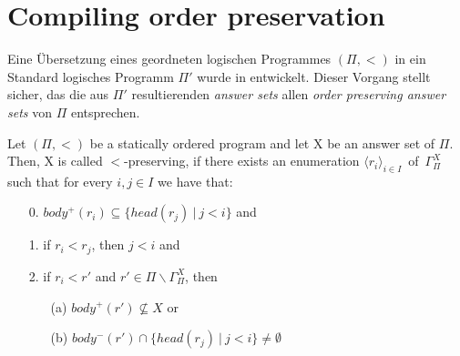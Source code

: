 \section{Compiling order preservation}

Eine Übersetzung eines geordneten logischen Programmes $(\Pi, <)$ in ein
Standard logisches Programm $\Pi'$ wurde in \cite{delgrande2000logic} entwickelt.
Dieser Vorgang stellt sicher, das die aus $\Pi'$ resultierenden \emph{answer sets}
allen \emph{order preserving answer sets} von $\Pi$ entsprechen.

\begin{definition}
  Let $(\Pi, <)$ be a statically ordered program and let X be an answer set of $\Pi$.
  Then, X is called $<$-preserving, if there exists an enumeration
  $\langle r_i \rangle_{i \in I}$~of~$\Gamma_{\Pi}^X$ such that for every $i, j \in I$
  we have that:
  \begin{itemize}
    \item[0.] $body^+(r_i) \subseteq \{ head(r_j)~|~j<i\}$ and \\
    \item[1.] if $r_i < r_j$, then $j<i$ and \\
    \item[2.] if $r_i < r'$ and $r' \in \Pi \backslash \Gamma_{\Pi}^X$, then
      \begin{itemize}
        \item[(a)] $body^+(r') \not \subseteq X$ or
        \item[(b)] $body^-(r') \cap \{head(r_j)~|~j<i\} \not = \emptyset$
      \end{itemize}
  \end{itemize}
\end{definition}

